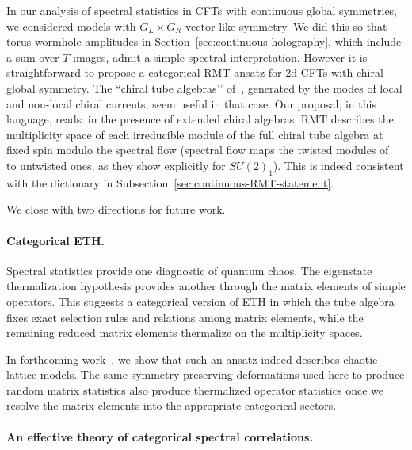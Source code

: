 \documentclass[11pt]{article}
\numberwithin{equation}{section}
\begin{document}
In our analysis of spectral statistics in CFTs with continuous global symmetries, we considered models with $G_L\times G_R$ vector-like symmetry. We did this so that torus wormhole amplitudes in Section~\ref{sec:continuous-holography}, which include a sum over $T$ images, admit a simple spectral interpretation. However it is straightforward to propose a categorical RMT ansatz for 2d CFTs with chiral global symmetry. The ``chiral tube algebras’' of~\cite{Benjamin:2026oqw}, generated by the modes of local and non-local chiral currents, seem useful 
in that case. Our proposal, in this language, reads: in the presence of extended chiral algebras, RMT describes the multiplicity space of each irreducible module of the full chiral tube algebra at fixed spin modulo the spectral flow (spectral flow maps the twisted modules of ~\cite{Benjamin:2026oqw} to untwisted ones, as they show explicitly for $SU(2)_1$). This is indeed consistent with the dictionary in Subsection~\ref{sec:continuous-RMT-statement}.

We close with two directions for future work.

\vspace{-.2cm}
\paragraph{Categorical ETH.}

Spectral statistics provide one diagnostic of quantum chaos. The eigenstate thermalization hypothesis provides another through the matrix elements of simple operators. This suggests a categorical version of ETH in which the tube algebra fixes exact selection rules and relations among matrix elements, while the remaining reduced matrix elements thermalize on the multiplicity spaces.

In forthcoming work~\cite{Jensen:2026cat}, we show that such an ansatz indeed describes chaotic lattice models. The same symmetry-preserving deformations used here to produce random matrix statistics also produce thermalized operator statistics once we resolve the matrix elements into the appropriate categorical sectors.

\vspace{-.2cm}
\paragraph{An effective theory of categorical spectral correlations.}
\end{document}
